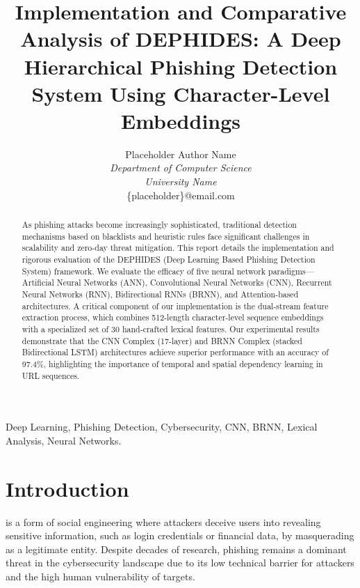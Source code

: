\documentclass[journal,twocolumn]{IEEEtran}
\begin{document}
\title{Implementation and Comparative Analysis of DEPHIDES: A Deep Hierarchical Phishing Detection System Using Character-Level Embeddings}

\author{Placeholder Author Name \\
\textit{Department of Computer Science} \\
\textit{University Name} \\
\{placeholder\}@email.com}

\maketitle

\begin{abstract}
As phishing attacks become increasingly sophisticated, traditional detection mechanisms based on blacklists and heuristic rules face significant challenges in scalability and zero-day threat mitigation. This report details the implementation and rigorous evaluation of the DEPHIDES (Deep Learning Based Phishing Detection System) framework. We evaluate the efficacy of five neural network paradigms—Artificial Neural Networks (ANN), Convolutional Neural Networks (CNN), Recurrent Neural Networks (RNN), Bidirectional RNNs (BRNN), and Attention-based architectures. A critical component of our implementation is the dual-stream feature extraction process, which combines 512-length character-level sequence embeddings with a specialized set of 30 hand-crafted lexical features. Our experimental results demonstrate that the CNN Complex (17-layer) and BRNN Complex (stacked Bidirectional LSTM) architectures achieve superior performance with an accuracy of 97.4\%, highlighting the importance of temporal and spatial dependency learning in URL sequences.
\end{abstract}

\begin{IEEEkeywords}
Deep Learning, Phishing Detection, Cybersecurity, CNN, BRNN, Lexical Analysis, Neural Networks.
\end{IEEEkeywords}

\section{Introduction}
 is a form of social engineering where attackers deceive users into revealing sensitive information, such as login credentials or financial data, by masquerading as a legitimate entity. Despite decades of research, phishing remains a dominant threat in the cybersecurity landscape due to its low technical barrier for attackers and the high human vulnerability of targets.
\end{document}
